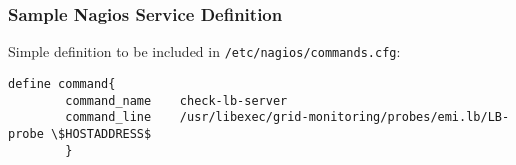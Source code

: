 \subsubsection{Sample Nagios Service Definition}
Simple definition to be included in \texttt{/etc/nagios/commands.cfg}:

\begin{verbatim}
define command{
        command_name    check-lb-server
        command_line    /usr/libexec/grid-monitoring/probes/emi.lb/LB-probe \$HOSTADDRESS$
        }
\end{verbatim}


